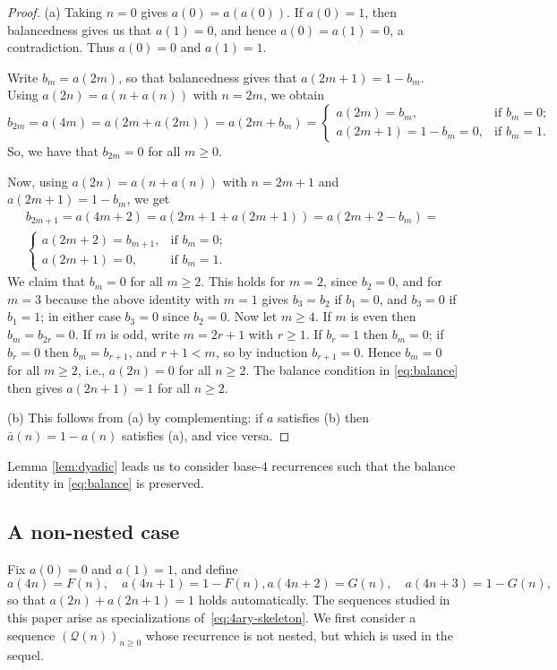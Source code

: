\documentclass[12pt,reqno]{article}
\theoremstyle{plain}
\theoremstyle{definition}
\theoremstyle{remark}
\begin{document}
\begin{proof}
 (a) Taking $n=0$ gives $a(0)=a(a(0))$. If $a(0)=1$, then balancedness gives us that $a(1)=0$, and hence $a(0)=a(1)=0$, 
 a contradiction. Thus $a(0) = 0$ and $a(1)=1$. 

 Write $b_m=a(2m)$, so that balancedness gives that $a(2m+1)=1-b_m$. Using $a(2n)=a(n+a(n))$ with $n=2m$, we obtain $$ b_{2 
 m} = a(4 m) = a(2 m + a(2 m)) = a(2 m + b_m) = 
\begin{cases}
a(2m) = b_m, & \text{if } b_m=0;\\
a(2m+1)=1-b_m=0, & \text{if } b_m=1.
\end{cases}
$$ So, we have that $b_{2m}=0$ for all $m\ge 0$.

 Now, using $a(2n)=a(n+a(n))$ with $n=2m+1$ and $a(2m+1)=1-b_m$, we get
\begin{multline*}
b_{2m+1}=a(4m+2)=a(2m+1+a(2m+1))=a(2m+2-b_m) = \\ 
\begin{cases}
a(2m+2)=b_{m+1}, & \text{if } b_m=0;\\
a(2m+1)=0, & \text{if } b_m=1.
\end{cases}
\end{multline*}
 We claim that $b_m=0$ for all $m\ge 2$. This holds for $m=2$, since $b_2 = 0$, and for $m=3$ because the above identity with $m = 
 1$ gives $b_3=b_2$ if $b_1=0$, and $b_3=0$ if $b_1=1$; in either case $b_3=0$ since $b_2=0$. Now let $m\ge 4$. If $m$ is even 
 then $b_m=b_{2r}=0$. If $m$ is odd, write $m=2r+1$ with $r\ge 1$. If $b_r=1$ then $b_m=0$; if $b_r=0$ then $b_m=b_{r + 1}$, and 
 $r + 1 < m$, so by induction $b_{r+1}=0$. Hence $b_m=0$ for all $m\ge 2$, i.e., $a(2n)=0$ for all $n\ge 2$. The balance condition in 
 \eqref{eq:balance} then gives $a(2n+1)=1$ for all $n\ge 2$.

 (b) This follows from (a) by complementing: if $a$ satisfies (b) then $\bar a(n)=1-a(n)$ satisfies (a), and vice versa.
\end{proof}

 Lemma \ref{lem:dyadic} leads us to consider base-$4$ recurrences such that the balance identity in \eqref{eq:balance} is preserved. 

\subsection{A non-nested case}
 Fix $a(0)=0$ and $a(1)=1$, and define
\begin{equation}\label{eq:4ary-skeleton} 
 a(4 n) = F(n), \quad a(4n+1)=1-F(n), 
 a(4n+2)=G(n), \quad a(4n+3)=1-G(n), 
\end{equation}
 so that $a(2n)+a(2n+1)=1$ holds automatically. The sequences studied in this paper arise as
 specializations of~\eqref{eq:4ary-skeleton}. We first consider a sequence $(\mathcal{Q}(n))_{n\ge 0}$
 whose recurrence is not nested, but which is used in the sequel.
\end{document}
